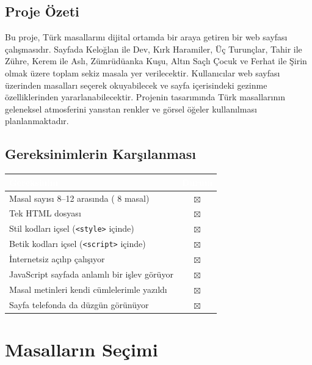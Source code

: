 \documentclass[12pt,a4paper]{article}
\begin{document}
\subsection{Proje Özeti}
Bu proje, Türk masallarını dijital ortamda bir araya getiren
bir web sayfası çalışmasıdır. Sayfada Keloğlan ile Dev, Kırk
Haramiler, Üç Turunçlar, Tahir ile Zühre, Kerem ile Aslı,
Zümrüdüanka Kuşu, Altın Saçlı Çocuk ve Ferhat ile Şirin
olmak üzere toplam sekiz masala yer verilecektir.
Kullanıcılar web sayfası üzerinden masalları seçerek
okuyabilecek ve sayfa içerisindeki gezinme özelliklerinden
yararlanabilecektir. Projenin tasarımında Türk masallarının
geleneksel atmosferini yansıtan renkler ve görsel öğeler
kullanılması planlanmaktadır.

\subsection{Gereksinimlerin Karşılanması}
\begin{center}
\begin{tabular}{@{}p{8.2cm}c@{}}
\toprule
\rowcolor{ana}\textcolor{white}{\textbf{Gereksinim}} & \textcolor{white}{\textbf{Durum}} \\
\midrule
Masal sayısı 8--12 arasında ( 8 masal)         &$\boxtimes$ \\
Tek HTML dosyası                                    & $\boxtimes$\\
Stil kodları içsel (\texttt{<style>} içinde)        & $\boxtimes$ \\
Betik kodları içsel (\texttt{<script>} içinde)      & $\boxtimes$ \\
İnternetsiz açılıp çalışıyor                        & $\boxtimes$ \\
JavaScript sayfada anlamlı bir işlev görüyor        & $\boxtimes$ \\
Masal metinleri kendi cümlelerimle yazıldı          & $\boxtimes$ \\
Sayfa telefonda da düzgün görünüyor                 & $\boxtimes$ \\
\bottomrule
\end{tabular}
\end{center}

\section{Masalların Seçimi}
\end{document}
